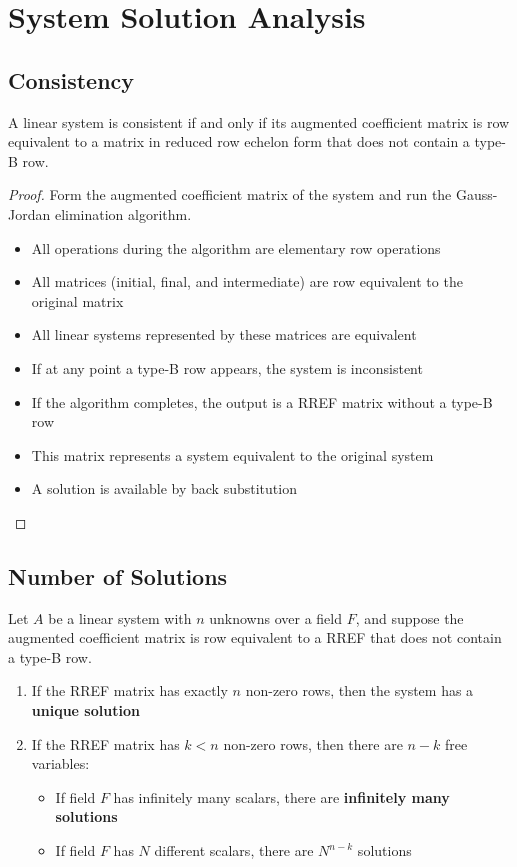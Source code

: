
\section{System Solution Analysis}

\subsection{Consistency}
\begin{theorem}\label{thm:consistency-condition}
    A linear system is consistent if and only if its augmented coefficient matrix is row equivalent to a matrix in reduced row echelon form that does not contain a type-B row.
\end{theorem}

\begin{proof}
    Form the augmented coefficient matrix of the system and run the Gauss-Jordan elimination algorithm.
    \begin{itemize}
        \item All operations during the algorithm are elementary row operations
        \item All matrices (initial, final, and intermediate) are row equivalent to the original matrix
        \item All linear systems represented by these matrices are equivalent
        \item If at any point a type-B row appears, the system is inconsistent
        \item If the algorithm completes, the output is a RREF matrix without a type-B row
        \item This matrix represents a system equivalent to the original system
        \item A solution is available by back substitution
    \end{itemize}
\end{proof}

\subsection{Number of Solutions}
Let $A$ be a linear system with $n$ unknowns over a field $F$, and suppose the augmented coefficient matrix is row equivalent to a RREF that does not contain a type-B row.

\begin{enumerate}
    \item If the RREF matrix has exactly $n$ non-zero rows, then the system has a \textbf{unique solution}
    \item If the RREF matrix has $k < n$ non-zero rows, then there are $n - k$ free variables:
    \begin{itemize}
        \item If field $F$ has infinitely many scalars, there are \textbf{infinitely many solutions}
        \item If field $F$ has $N$ different scalars, there are $N^{n-k}$ solutions
    \end{itemize}
\end{enumerate}

